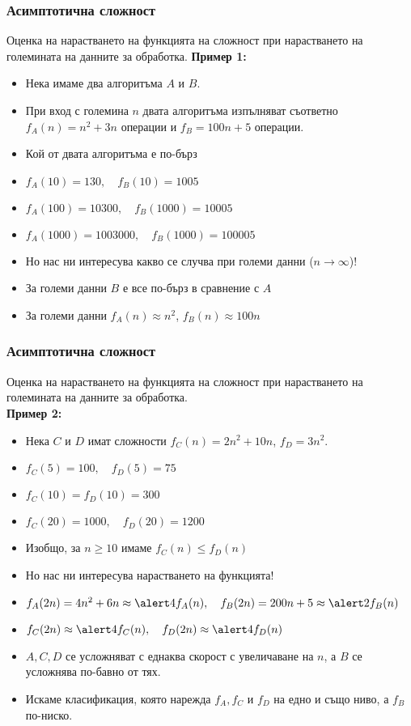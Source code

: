\documentclass{beamer}
\begin{document}
\begin{frame}
  \frametitle{Асимптотична сложност}

  Оценка на нарастването на функцията на сложност при \alert<8>{нарастването} на големината на данните за обработка.
  \pause
  \textbf{Пример 1:}
  \begin{itemize}[<+->]
  \item Нека имаме два алгоритъма $A$ и $B$.
  \item При вход с големина $n$ двата алгоритъма изпълняват съответно $f_A(n) = n^2 + 3n$ операции и
    $f_B = 100n + 5$ операции.
  \item<+-|alert@+-> Кой от двата алгоритъма е по-бърз
  \item $f_A(10) = 130,\quad f_B(10) = 1005$
  \item $f_A(100) = 10300,\quad f_B(1000) = 10005$
  \item $f_A(1000) = 1003000,\quad f_B(1000) = 100005$
  \item Но нас ни интересува какво се случва при \alert{големи данни ($n \to \infty$)}!
  \item За големи данни $B$ е все по-бърз в сравнение с $A$
  \item За големи данни $f_A(n) \approx n^2$, $f_B(n) \approx 100n$
  \end{itemize}
\end{frame}

\begin{frame}
  \frametitle{Асимптотична сложност}

  Оценка на \alert<6>{нарастването} на функцията на сложност при нарастването на големината на данните за обработка.\\
  \textbf{Пример 2:}
  \begin{itemize}[<+->]
  \item Нека $C$ и $D$ имат сложности $f_C(n) = 2n^2 + 10n$, $f_D = 3n^2$.
  \item $f_C(5) = 100,\quad f_D(5)= 75$
  \item $f_C(10) = f_D(10) = 300$
  \item $f_C(20) = 1000,\quad f_D(20) = 1200$
  \item Изобщо, за $n \geq 10$ имаме $f_C(n) \leq f_D(n)$
  \item Но нас ни интересува \alert{нарастването} на функцията!
  \item $f_A(2n) = 4n^2 + 6n \approx \alert4f_A(n), \quad f_B(2n) = 200n + 5 \approx \alert2f_B(n)$
  \item $f_C(2n) \approx \alert4f_C(n),\quad f_D(2n) \approx \alert4f_D(n)$
  \item $A, C, D$ се усложняват с еднаква скорост с увеличаване на $n$, а $B$ се усложнява по-бавно от тях.
  \item Искаме класификация, която нарежда $f_A, f_C$ и $f_D$ на едно и също ниво, а $f_B$ по-ниско.
  \end{itemize}
\end{frame}
\end{document}
